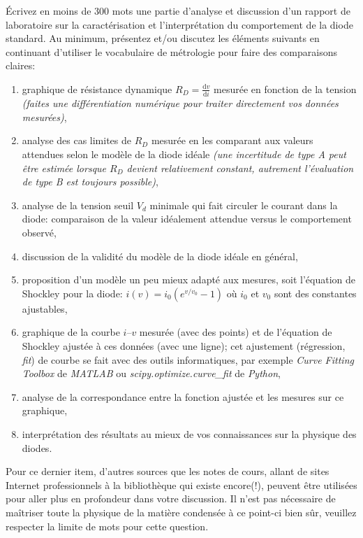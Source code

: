 \documentclass[canadien,12pt,oneside,letterpaper]{article}
\begin{document}
Écrivez en moins de 300 mots une partie d'analyse et discussion d'un rapport de laboratoire sur la caractérisation et l'interprétation du comportement de la diode standard. Au minimum, présentez et/ou discutez les éléments suivants en continuant d'utiliser le vocabulaire de métrologie pour faire des comparaisons claires:
\begin{enumerate}
    \item graphique de résistance dynamique $R_{D}=\frac{\mathrm{d}v}{\mathrm{d}i}$ mesurée en fonction de la tension \emph{(faites une différentiation numérique pour traiter directement vos données mesurées)},
    \item analyse des cas limites de $R_{D}$ mesurée en les comparant aux valeurs attendues selon le modèle de la diode idéale \emph{(une incertitude de type A peut être estimée lorsque $R_{D}$ devient relativement constant, autrement l'évaluation de type B est toujours possible)},
    \item analyse de la tension seuil $V_{d}$ minimale qui fait circuler le courant dans la diode: comparaison de la valeur idéalement attendue versus le comportement observé, 
    \item discussion de la validité du modèle de la diode idéale en général,
    \item proposition d'un modèle un peu mieux adapté aux mesures, soit l'équation de Shockley pour la diode: $i\left( v\right) = i_0\left(e^{v/v_0}-1 \right)$ où $i_0$ et $v_0$ sont des constantes ajustables,
    \item graphique de la courbe $i$--$v$ mesurée (avec des points) et de l'équation de Shockley ajustée à ces données (avec une ligne); cet ajustement (régression, \textit{fit}) de courbe se fait avec des outils informatiques, par exemple \textit{Curve Fitting Toolbox} de \textit{MATLAB} ou \textit{scipy.optimize.curve\_fit} de \textit{Python},
    \item analyse de la correspondance entre la fonction ajustée et les mesures sur ce graphique,
    \item interprétation des résultats au mieux de vos connaissances sur la physique des diodes.
\end{enumerate}

Pour ce dernier item, d'autres sources que les notes de cours, allant de sites Internet professionnels à la bibliothèque qui existe encore(!), peuvent être utilisées pour aller plus en profondeur dans votre discussion. Il n'est pas nécessaire de maîtriser toute la physique de la matière condensée à ce point-ci bien sûr, veuillez respecter la limite de mots pour cette question.
\end{document}
